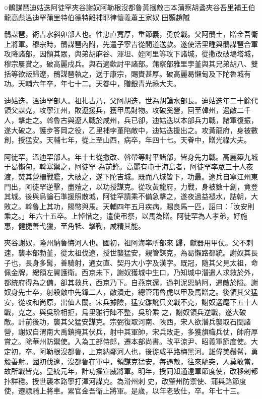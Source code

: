 
\begin{pinyinscope}

 ○鶻謀琶迪姑迭阿徒罕夾谷謝奴阿勒根沒都魯黃摑敵古本蒲察胡盞夾谷吾里補王伯龍高彪溫迪罕蒲里特伯德特離補耶律懷義蕭王家奴
 田顥趙隇



 鶻謀琶，術吉水斜卯部人也。性忠直寬厚，重節義，勇於戰。父阿鶻土，贈金吾衛上將軍。穆宗時，鶻謀琶內附，先遣子寧吉從間道送款。遂使活里畽與鶻謀琶合軍攻降諸部，因領其眾，與弟胡麻谷、渾坦、姪阿里等攻下諸城，從撒改破塢塔城，穆宗屢賞之。破高麗戍兵。與石適歡討平諸部。蒲察部雅里孛堇與其兄弟胡八、雙括等欲叛歸遼，鶻謀琶執之，送于康宗，賜賚甚厚。破高麗曷懶甸及下陀魯城有功。天輔六年卒，年七十二。天眷中，贈銀青光祿大夫。



 迪姑迭，溫迪罕部人。祖扎古乃，父阿胡迭，世為胡論水部長。迪姑迭年二十餘代領父謀克，攻寧江州，敗遼援兵，獲甲馬財物。攻破奚營，回至韓州，遇敵二千人，擊走之。斡魯古與遼人戰於咸州，兵已卻，迪姑迭以本部兵力戰，諸軍復振，遂大破之。護步答岡之役，乙里補孛堇陷敵中，迪姑迭援出之。攻黃龍府，身被數創，授猛安。天輔七年，從上至山西，病卒，年四十七。天眷中，贈光祿大夫。



 阿徒罕，溫迪罕部人。年十七從撒改、斡帶等討平諸部，皆身先力戰。高麗築九城于曷懶甸，斡塞禦之，阿徒罕
 為前鋒。高麗有屯于海島者，阿徒罕率眾三十人夜渡，焚其營柵戰艦，大破之，遂下陀吉城。既而八城皆下，功最。遼兵自寧江州東門出，阿徒罕逆擊，盡殪之，以功授謀克。從攻黃龍府，力戰，身被數十創，竟登其城。後與烏論石準援照散城，阿徒罕請乘不備急擊之，遂夜過益褪水，詰朝，大敗之。斡魯上其功，賜幣與馬。天輔四年五月疾病，賜良馬一匹，詔曰：「汝安則乘之。」年六十五卒。上悼惜之，遣使弔祭，以馬為贈。阿徒罕為人孝弟，好施惠，健捷善弋獵，至角牴、擊鞠，咸精其能。



 夾谷謝奴，隆州納魯悔河人也。國初，祖阿海率所部來
 歸，獻器用甲仗。父不剌速，襲本部勃堇，從太祖伐遼，授世襲猛安，親管謀克，為曷懶路都統。謝奴其長子也，長身多髯，善騎射，通女直、契丹大小字及漢字。既冠，隨其父見太祖，命佩金牌，總領左翼護衛。西京未下，謝奴獲城中生口，乃知城中潛遣人求救於外，都統府得為之備，卻其救兵，西京乃下。自燕京還，過判泥恩納阿，遇敵於隘。謝奴身先士卒，射殺敵中先鋒二人，敵潰走，總管蒲魯虎以甲及馬贈之。後領其父猛安，從攻和尚原，出仙人關。宋兵據險，猛安雛訛只突戰不克，謝奴選麾下五十人戰，克之。與吳玠相拒，烏里雅行陣不整，吳玠乘
 之，謝奴領兵逆戰，遂大破敵。計前後功，襲其父猛安謀克。宗弼復取河南、陜西，宋人欲潛兵襲取石閏諸營，謝奴自渭南大禹鎮掩其伏兵，射中其軍帥，宋兵敗走，多獲旗幟兵仗，帥府厚賞之。除華州防禦使。入為工部侍郎，遷本部尚書。改平涼尹、昭義軍節度使。大定初，卒。阿勒根沒都魯，上京納鄰河人也，後徙咸平路梅黑河。雄偉美鬚髯，勇毅善射。國初伐遼，沒都魯在軍中，領謀克猛安，每遇敵，往來馳突，人莫敢當，故所戰皆克。皇統元年，計功擢宣威將軍。明年，授同知通遠軍節度使，改移剌都抃詳穩。授世襲本路寧打渾河謀克。為滑州刺
 史，改肇州防禦使、蒲與路節度使，遷驃騎上將車。累官金吾衛上將軍。是歲，以年老致仕，卒。年七十三。




\end{pinyinscope}
